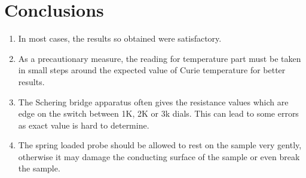 \documentclass[%
 aip,
 amsmath,amssymb,
 reprint, floatfix%
]{revtex4-1}
\begin{document}
\section{Conclusions}
\begin{enumerate}
    \item In most cases, the results so obtained were satisfactory.
    \item As a precautionary measure, the reading for temperature part must be taken in small steps around the expected value of Curie temperature for better results.
    \item The Schering bridge apparatus often gives the resistance values which are edge on the switch between 1K, 2K or 3k dials. This can lead to some errors as exact value is hard to determine.
    \item The spring loaded probe should be allowed to rest on the sample very gently, otherwise it may damage the conducting surface of the sample or even break the sample.
\end{enumerate}

\nocite{*}
\end{document}
